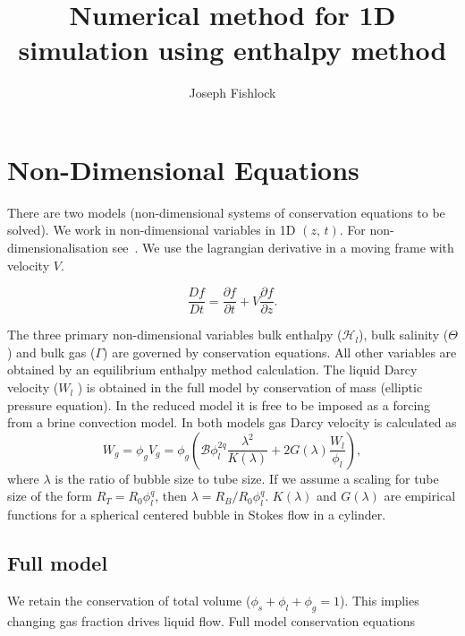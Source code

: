 \documentclass[a4paper,11pt]{article}
\title{\textbf{Numerical method for 1D simulation using enthalpy method}}
\author{Joseph Fishlock}
\numberwithin{equation}{section}
\begin{document}
\maketitle

\tableofcontents

\clearpage

\section{Non-Dimensional Equations}\label{sec:Non-Dimensional-Equations}

There are two models (non-dimensional systems of conservation equations to be solved).
We work in non-dimensional variables in 1D $(z, \, t)$.
For non-dimensionalisation see~.
We use the lagrangian derivative in a moving frame with velocity $V$.

\begin{equation}\label{eq:lagrangian-derivative}
  \frac{Df}{Dt} = \frac{\partial f}{\partial t} + V \frac{\partial f}{\partial z}.
\end{equation}

The three primary non-dimensional variables
bulk enthalpy ($\mathcal{H}_l$),
bulk salinity ($\Theta$ )
and bulk gas ($\Gamma$)
are governed by conservation equations.
All other variables are obtained by an equilibrium enthalpy method calculation.
The liquid Darcy velocity ($W_l$ ) is obtained in the full model by conservation of mass (elliptic pressure equation).
In the reduced model it is free to be imposed as a forcing from a brine convection model.
In both models gas Darcy velocity is calculated as
\begin{equation}\label{eq:Gas-Darcy-Velocity}
  W_g = \phi_g V_g = \phi_g \left( \mathcal{B} \phi_l^{2q}\frac{\lambda^2}{K(\lambda)} + 2 G(\lambda) \frac{W_l}{\phi_l} \right),
\end{equation}
where $\lambda$ is the ratio of bubble size to tube size.
If we assume a scaling for tube size of the form $R_T = R_0 \phi_l^q$,
then  $\lambda = R_B / R_0 \phi_l^q$.
$K(\lambda)$ and $G(\lambda)$ are empirical functions for a spherical centered bubble in Stokes flow in a cylinder.


\subsection{Full model}\label{sec:Full-model}

We retain the conservation of total volume ($\phi_s + \phi_l + \phi_g = 1$).
This implies changing gas fraction drives liquid flow.
Full model conservation equations
\end{document}
